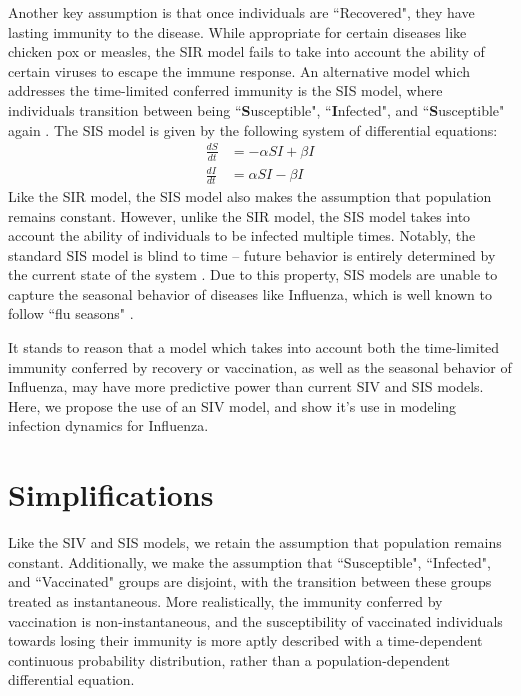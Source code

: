 \documentclass[11pt]{article}
\begin{document}
Another key assumption is that once individuals are ``Recovered", they have lasting immunity to the disease. While appropriate for certain diseases like chicken pox or measles, the SIR model fails to take into account the ability of certain viruses to escape the immune response. An alternative model which addresses the time-limited conferred immunity is the SIS model, where individuals transition between being ``\textbf{S}usceptible", ``\textbf{I}nfected", and ``\textbf{S}usceptible" again \citep{doi:10.1093/bmb/ldp038}. The SIS model is given by the following system of differential equations:
\begin{equation}
\begin{aligned}
\frac{dS}{dt} &= -\alpha S I + \beta I \\
\frac{dI}{dt} &= \alpha S I - \beta I
\end{aligned}
\end{equation}
Like the SIR model, the SIS model also makes the assumption that population remains constant. However, unlike the SIR model, the SIS model takes into account the ability of individuals to be infected multiple times. Notably, the standard SIS model is blind to time -- future behavior is entirely determined by the current state of the system \citep{1742-5468-2012-05-P05012}. Due to this property, SIS models are unable to capture the seasonal behavior of diseases like Influenza, which is well known to follow ``flu seasons" \citep{Bedford191676}.

It stands to reason that a model which takes into account both the time-limited immunity conferred by recovery or vaccination, as well as the seasonal behavior of Influenza, may have more predictive power than current SIV and SIS models. Here, we propose the use of an SIV model, and show it's use in modeling infection dynamics for Influenza.

\section*{Simplifications}
Like the SIV and SIS models, we retain the assumption that population remains constant. Additionally, we make the assumption that ``Susceptible", ``Infected", and ``Vaccinated" groups are disjoint, with the transition between these groups treated as instantaneous. More realistically, the immunity conferred by vaccination is non-instantaneous, and the susceptibility of vaccinated individuals  towards losing their immunity is more aptly described with a time-dependent continuous probability distribution, rather than a population-dependent differential equation.
\end{document}
